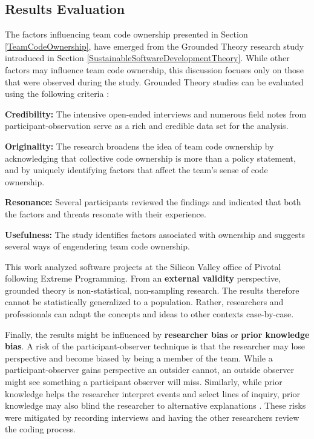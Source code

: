 \subsection{Results Evaluation}

The factors influencing team code ownership presented in Section \ref{TeamCodeOwnership}, have emerged from the Grounded Theory research study introduced in Section \ref{SustainableSoftwareDevelopmentTheory}. While other factors may influence team code ownership, this discussion focuses only on those that were observed during the study. Grounded Theory studies can be evaluated using the following criteria \cite{Charmaz}: 

\textbf{Credibility:}  The \numberOfInterviews{} intensive open-ended interviews and numerous field notes from participant-observation serve as a rich and credible data set for the analysis. 

\textbf{Originality:} The research broadens the idea of team code ownership by acknowledging that collective code ownership is more than a policy statement, and by uniquely identifying factors that affect the team's sense of code ownership.

\textbf{Resonance:} Several participants reviewed the findings and indicated that both the factors and threats resonate with their experience.

\textbf{Usefulness:} The study identifies factors associated with ownership and suggests several ways of engendering team code ownership.

This work analyzed software projects at the Silicon Valley office of Pivotal following Extreme Programming. From an \textbf{external validity} perspective, grounded theory is non-statistical, non-sampling research. The results therefore cannot be statistically generalized to a population. Rather, researchers and professionals can adapt the concepts and ideas to other contexts case-by-case. 

Finally, the results might be influenced by \textbf{researcher bias} or \textbf{prior knowledge bias}. A risk of the participant-observer technique is that the researcher may lose perspective and become biased by being a member of the team. While a participant-observer gains perspective an outsider cannot, an outside observer might see something a participant observer will miss. Similarly, while prior knowledge helps the researcher interpret events and select lines of inquiry, prior knowledge may also blind the researcher to alternative explanations \cite{GlaserIssues}. These risks were mitigated by recording interviews and having the other researchers review the coding process. 

